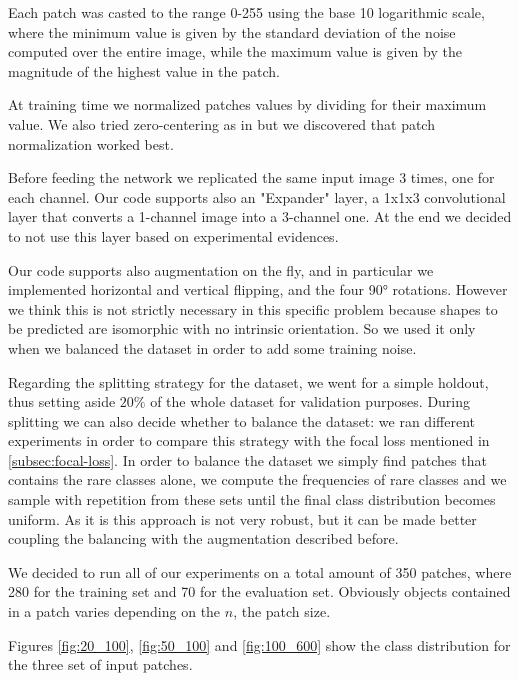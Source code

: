 \documentclass[a4paper,10pt]{report}
\begin{document}
Each patch was casted to the range 0-255 using the base 10 logarithmic scale, where the minimum value is given by the standard deviation of the noise computed over the entire image, while the maximum value is given by the magnitude of the highest value in the patch. 

At training time we normalized patches values by dividing for their maximum value. We also tried zero-centering as in \cite{claran} but we discovered that patch normalization worked best.

Before feeding the network we replicated the same input image 3 times, one for each channel. Our code supports also an "Expander" layer, a 1x1x3 convolutional layer that converts a 1-channel image into a 3-channel one. At the end we decided to not use this layer based on experimental evidences.

Our code supports also augmentation on the fly, and in particular we implemented horizontal and vertical flipping, and the four 90° rotations. However we think this is not strictly necessary in this specific problem because shapes to be predicted are isomorphic with no intrinsic orientation. So we used it only when we balanced the dataset in order to add some training noise.

Regarding the splitting strategy for the dataset, we went for a simple holdout, thus setting aside $20\%$ of the whole dataset for validation purposes. 
During splitting we can also decide whether to balance the dataset: we ran different experiments in order to compare this strategy with the focal loss mentioned in \ref{subsec:focal-loss}.
In order to balance the dataset we simply find patches that contains the rare classes alone, we compute the frequencies of rare classes and we sample with repetition from these sets until the final class distribution becomes uniform. As it is this approach is not very robust, but it can be made better coupling the balancing with the augmentation described before.

We decided to run all of our experiments on a total amount of 350 patches, where 280 for the training set and 70 for the evaluation set. Obviously objects contained in a patch varies depending on the $n$, the patch size.

Figures \ref{fig:20_100}, \ref{fig:50_100} and \ref{fig:100_600} show the class distribution for the three set of input patches.
\end{document}
